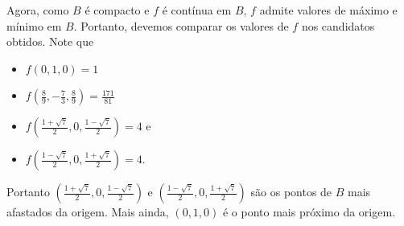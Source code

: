 \begin{example}
    Agora, como \(B\) é compacto e \(f\) é contínua em \(B\), \(f\) admite valores de máximo e mínimo em \(B\). Portanto, devemos comparar os valores de \(f\) nos candidatos obtidos. Note que
        \begin{itemize}
            \item \(f(0,1,0) = 1\)
            \item \(f \left( \frac{8}{9},-\frac{7}{3}, \frac{8}{9} \right) = \frac{171}{81}\) 
            \item \(f\left( \frac{1+\sqrt{7}}{2},0,\frac{1-\sqrt{7}}{2} \right) = 4\) e 
            \item \(f\left( \frac{1-\sqrt{7}}{2},0,\frac{1+\sqrt{7}}{2} \right) = 4\).
        \end{itemize}
    Portanto \(\left( \frac{1+\sqrt{7}}{2},0,\frac{1-\sqrt{7}}{2} \right) \text{ e } \left( \frac{1-\sqrt{7}}{2},0,\frac{1+\sqrt{7}}{2} \right)\) são os pontos de \(B\) mais afastados da origem. Mais ainda, \((0,1,0)\) é o ponto mais próximo da origem.
\end{example}

